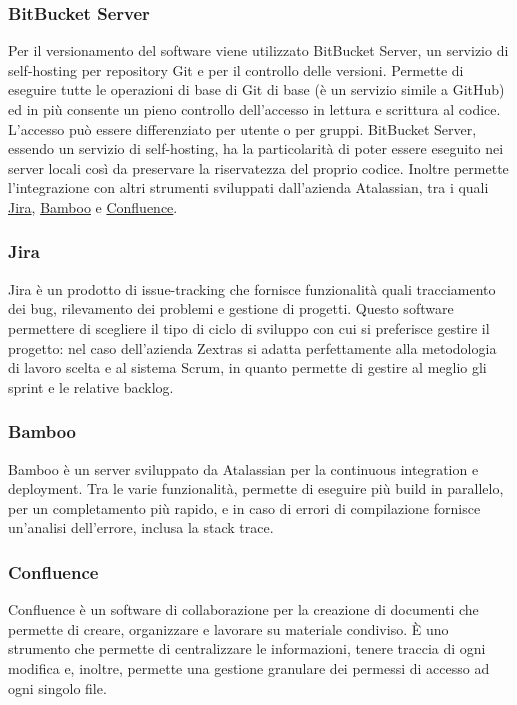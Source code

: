 \subsubsection{BitBucket Server}
Per il versionamento del software viene utilizzato BitBucket Server, un servizio di self-hosting per repository Git e per il controllo delle versioni. Permette di eseguire tutte le operazioni di base di Git di base (è un servizio simile a GitHub) ed in più consente un pieno controllo dell'accesso in lettura e scrittura al codice. L'accesso può essere differenziato per utente o per gruppi. BitBucket Server, essendo un servizio di self-hosting, ha la particolarità di poter essere eseguito nei server locali così da preservare la riservatezza del proprio codice. Inoltre permette l'integrazione con altri strumenti sviluppati dall'azienda Atalassian, tra i quali \hyperref[subsubsec:jira]{Jira}, \hyperref[subsubsec:bamboo]{Bamboo} e \hyperref[subsubsec:confluence]{Confluence}.
\subsubsection{Jira}\label{subsubsec:jira}
Jira è un prodotto di issue-tracking che fornisce funzionalità quali tracciamento dei bug, rilevamento dei problemi e gestione di progetti. Questo software permettere di scegliere il tipo di ciclo di sviluppo con cui si preferisce gestire il progetto: nel caso dell'azienda Zextras si adatta perfettamente alla metodologia di lavoro scelta e al sistema Scrum, in quanto permette di gestire al meglio gli sprint e le relative backlog.
\subsubsection{Bamboo}\label{subsubsec:bamboo}
Bamboo è un server sviluppato da Atalassian per la continuous integration e deployment. Tra le varie funzionalità, permette di eseguire più build in parallelo, per un completamento più rapido, e in caso di errori di compilazione fornisce un'analisi dell'errore, inclusa la stack trace.
\subsubsection{Confluence}\label{subsubsec:confluence}
Confluence è un software di collaborazione per la creazione di documenti che permette di creare, organizzare e lavorare su materiale condiviso. È uno strumento che permette di centralizzare le informazioni, tenere traccia di ogni modifica e, inoltre, permette una gestione granulare dei permessi di accesso ad ogni singolo file.

